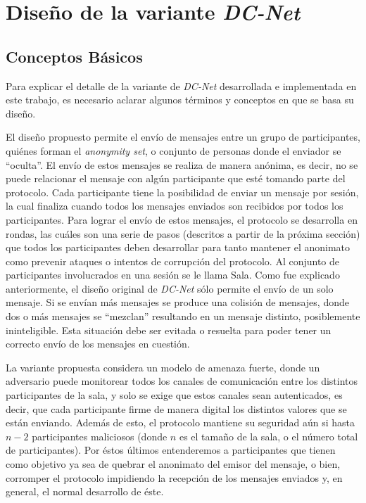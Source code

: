 \chapter{Diseño de la variante \emph{DC-Net}}\label{cap3}

\section{Conceptos Básicos}

Para explicar el detalle de la variante de \emph{DC-Net} desarrollada e 
implementada en este trabajo, es necesario aclarar algunos términos y 
conceptos en que se basa su diseño.

El diseño propuesto permite el envío de mensajes entre un grupo de 
participantes, quiénes forman el \emph{anonymity set}, o conjunto de personas 
donde el enviador se ``oculta''. El envío de estos 
mensajes se realiza de manera anónima, es decir, no se puede relacionar el 
mensaje con algún participante que esté tomando parte del protocolo. Cada 
participante tiene la posibilidad de enviar un mensaje por sesión, la cual 
finaliza cuando todos los mensajes enviados son 
recibidos por todos los participantes. Para lograr el envío de estos mensajes, 
el protocolo se desarrolla en rondas, las cuáles son una serie de pasos 
(descritos a partir de la próxima sección) que todos los participantes deben 
desarrollar para tanto mantener el anonimato como prevenir ataques o intentos 
de corrupción del protocolo. Al conjunto de 
participantes involucrados en una sesión se le llama Sala. Como fue explicado 
anteriormente, el diseño original de \emph{DC-Net} sólo permite el envío de un 
solo mensaje. Si se envían más mensajes se produce una colisión de mensajes,  
donde dos o más mensajes se
``mezclan'' resultando en un mensaje distinto, posiblemente
ininteligible. Esta situación debe ser evitada o resuelta para poder
tener un correcto envío de los mensajes en cuestión.

La variante propuesta considera un modelo de amenaza fuerte, donde un 
adversario puede monitorear todos los canales de 
comunicación entre los distintos participantes de la sala, y solo se exige que 
estos canales sean autenticados, es decir, que cada participante firme de 
manera digital los distintos valores que se están enviando. Además de esto, el 
protocolo mantiene su seguridad aún si hasta $n-2$ participantes maliciosos 
(donde $n$ es el tamaño de la 
sala, o el número total de participantes). Por éstos últimos entenderemos a 
participantes que tienen como objetivo ya sea de quebrar el anonimato del 
emisor del mensaje, o bien, corromper el protocolo impidiendo la recepción de 
los mensajes enviados y, en general, el normal desarrollo de éste.

